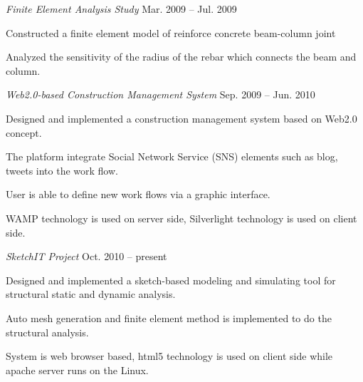 \documentclass[margin,line]{cv}
\begin{document}
\begin{resume}
	\textsl{Finite Element Analysis Study} \hfill Mar. 2009 -- Jul. 2009
	\vspace{-2mm}\\\vspace{-1mm}%
	\begin{list2}
		\item Constructed a finite element model of reinforce concrete beam-column joint
		\item Analyzed the sensitivity of the radius of the rebar which connects the beam and column.
	\end{list2}

	\textsl{Web2.0-based Construction Management System} \hfill Sep. 2009 -- Jun. 2010
	\vspace{-2mm}\\\vspace{-1mm}%
	\begin{list2}
		\item Designed and implemented a construction management system based on Web2.0 concept.
		\item The platform integrate Social Network Service (SNS) elements such as blog, tweets into the work flow.
		\item User is able to define new work flows via a graphic interface.
		\item WAMP technology is used on server side, Silverlight technology is used on client side.
	\end{list2}

	\textsl{SketchIT Project} \hfill Oct. 2010 -- present
	\vspace{-2mm}\\\vspace{-1mm}%
	\begin{list2}
		\item Designed and implemented a sketch-based modeling and simulating tool for structural static and dynamic analysis.
		\item Auto mesh generation and finite element method is implemented to do the structural analysis.
		\item System is web browser based, html5 technology is used on client side while apache server runs on the Linux.
	\end{list2}





\end{resume}
\end{document}
